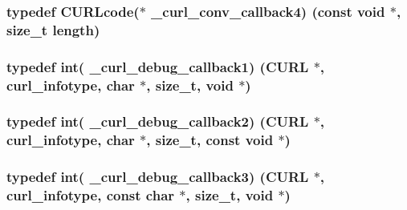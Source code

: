 \subsubsection[{\+\_\+curl\+\_\+conv\+\_\+callback4}]{\setlength{\rightskip}{0pt plus 5cm}typedef {\bf C\+U\+R\+Lcode}($\ast$ \+\_\+curl\+\_\+conv\+\_\+callback4) (const void $\ast$, size\+\_\+t length)}\label{typecheck-gcc_8h_ac3b116e3ba589ed78cc87e7c3112ea3a}
\hypertarget{typecheck-gcc_8h_a7df204c26605e377eb51af8159aaa6aa}{}
\subsubsection[{\+\_\+curl\+\_\+debug\+\_\+callback1}]{\setlength{\rightskip}{0pt plus 5cm}typedef int( \+\_\+curl\+\_\+debug\+\_\+callback1) ({\bf C\+U\+R\+L} $\ast$, {\bf curl\+\_\+infotype}, char $\ast$, size\+\_\+t, void $\ast$)}\label{typecheck-gcc_8h_a7df204c26605e377eb51af8159aaa6aa}
\hypertarget{typecheck-gcc_8h_abff1bf0f556f56841d7ee494e28488a4}{}
\subsubsection[{\+\_\+curl\+\_\+debug\+\_\+callback2}]{\setlength{\rightskip}{0pt plus 5cm}typedef int( \+\_\+curl\+\_\+debug\+\_\+callback2) ({\bf C\+U\+R\+L} $\ast$, {\bf curl\+\_\+infotype}, char $\ast$, size\+\_\+t, const void $\ast$)}\label{typecheck-gcc_8h_abff1bf0f556f56841d7ee494e28488a4}
\hypertarget{typecheck-gcc_8h_a6b69c0e254e465fbaf746b1ef7067914}{}
\subsubsection[{\+\_\+curl\+\_\+debug\+\_\+callback3}]{\setlength{\rightskip}{0pt plus 5cm}typedef int( \+\_\+curl\+\_\+debug\+\_\+callback3) ({\bf C\+U\+R\+L} $\ast$, {\bf curl\+\_\+infotype}, const char $\ast$, size\+\_\+t, void $\ast$)}\label{typecheck-gcc_8h_a6b69c0e254e465fbaf746b1ef7067914}
\hypertarget{typecheck-gcc_8h_a8577cd6fbe76c09f0e0242d94f842651}{}
